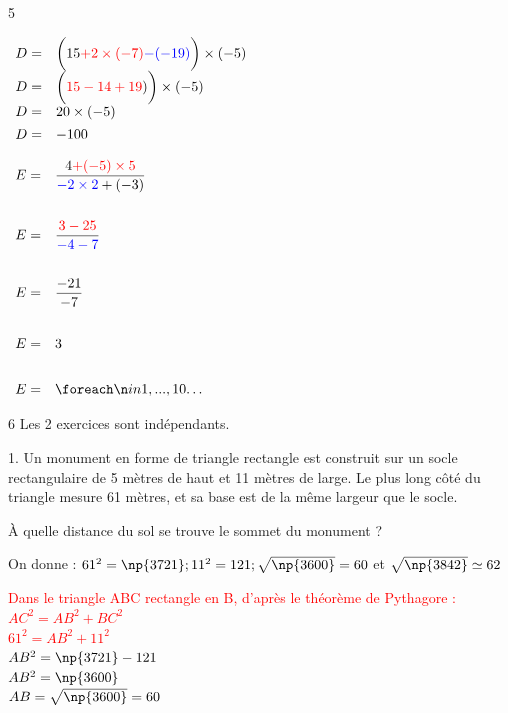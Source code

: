 \documentclass[a4paper]{book}
\begin{document}
{\begin{exerciceNote}{5}
\begin{minipage}{0.30\linewidth}
            $\begin{array}{ll}
                D = & \bigg(15\textcolor{red}{+2\times(-7)}\textcolor{blue}{-(-19)}\bigg)\times(-5) \\[1ex]
                D = & \bigg(\textcolor{red}{15-14+19})\bigg)\times(-5)\\[1ex]
                D = & 20\times(-5)\\[1ex]
                D = & -100
            \end{array}$
        \end{minipage}
        \hfill
        \begin{minipage}[t]{0.30\linewidth}
            $\begin{array}{ll}
                E = & \dfrac{4\textcolor{red}{+(-5)\times5}}{\textcolor{blue}{-2\times2}+(-3)} \\ \\[2ex]
                E = & \dfrac{\textcolor{red}{3-25}}{\textcolor{blue}{-4-7}} \\ \\[2ex]
                E = & \dfrac{-21}{-7} \\ \\[2ex]
                E = & 3 \\ \\[2ex]
                E = & \points[10] 
            \end{array}$
        \end{minipage}
    \end{exerciceNote}


    \begin{exerciceNote}{6}
        Les 2 exercices sont indépendants.
        
        \begin{minipage}{0.7\linewidth}
            1. Un monument en forme de triangle rectangle est construit sur un socle rectangulaire de 5 mètres de haut et 11 mètres de large. Le plus long côté du triangle mesure 61 mètres, et sa base est de la même largeur que le socle.

            \medskip

            À quelle distance du sol se trouve le sommet du monument ? 

            On donne : $61^2=\np{3721}; 11^2=121; \sqrt{\np{3600}}=60$ et $\sqrt{\np{3842}}\simeq62$

            \bigskip

            \textcolor{red}{Dans le triangle ABC rectangle en B, d'après le théorème de Pythagore :\\
            $AC^2=AB^2+BC^2$\\
            $61^2=AB^2+11^2$\\
            $AB^2=\np{3721}-121$\\
            $AB^2=\np{3600}$\\
            $AB=\sqrt{\np{3600}}=60$}


\end{minipage}
\end{exerciceNote}}
\end{document}
